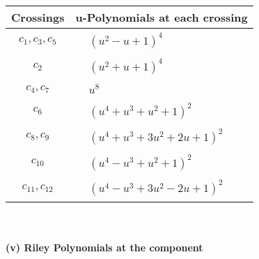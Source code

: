 \documentclass[1p]{elsarticle_modified}
\theoremstyle{definition}
\begin{document}
\begin{tabular}{m{50pt}|m{274pt}}
Crossings & \hspace{64pt}u-Polynomials at each crossing \\
\hline $$\begin{aligned}c_{1},c_{3},c_{5}\end{aligned}$$&$\begin{aligned}
&(u^2- u+1)^4
\end{aligned}$\\
\hline $$\begin{aligned}c_{2}\end{aligned}$$&$\begin{aligned}
&(u^2+u+1)^4
\end{aligned}$\\
\hline $$\begin{aligned}c_{4},c_{7}\end{aligned}$$&$\begin{aligned}
&u^8
\end{aligned}$\\
\hline $$\begin{aligned}c_{6}\end{aligned}$$&$\begin{aligned}
&(u^4+u^3+u^2+1)^2
\end{aligned}$\\
\hline $$\begin{aligned}c_{8},c_{9}\end{aligned}$$&$\begin{aligned}
&(u^4+u^3+3 u^2+2 u+1)^2
\end{aligned}$\\
\hline $$\begin{aligned}c_{10}\end{aligned}$$&$\begin{aligned}
&(u^4- u^3+u^2+1)^2
\end{aligned}$\\
\hline $$\begin{aligned}c_{11},c_{12}\end{aligned}$$&$\begin{aligned}
&(u^4- u^3+3 u^2-2 u+1)^2
\end{aligned}$\\
\hline
\end{tabular}\\~\\
\newpage\renewcommand{\arraystretch}{1}
\flushleft \textbf{(v) Riley Polynomials at the component}\newline \\
\end{document}

